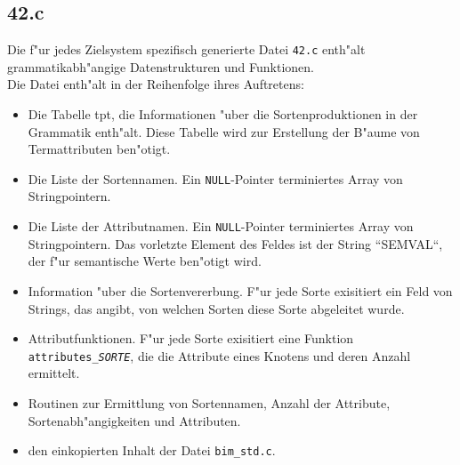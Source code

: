 \subsection{42.c}
Die f"ur jedes Zielsystem spezifisch generierte Datei {\tt 42.c} enth"alt
grammatikabh"angige Datenstrukturen und Funktionen.\\ Die Datei enth"alt in
der Reihenfolge ihres Auftretens:\\
\begin{itemize}
\item Die Tabelle tpt, die Informationen "uber die Sortenproduktionen in
der Grammatik enth"alt. Diese Tabelle wird zur Erstellung der B"aume
von Termattributen ben"otigt.
\item Die Liste der Sortennamen. Ein {\tt NULL}-Pointer terminiertes Array
von Stringpointern.
\item Die Liste der Attributnamen. Ein {\tt NULL}-Pointer terminiertes Array
von Stringpointern. Das vorletzte Element des Feldes ist der String
 ``SEMVAL``, der f"ur semantische Werte ben"otigt wird.
\item Information "uber die Sortenvererbung. F"ur jede Sorte exisitiert ein
Feld von Strings, das angibt, von welchen Sorten diese Sorte abgeleitet wurde.
\item Attributfunktionen. F"ur jede Sorte exisitiert eine Funktion {\tt
attributes\_\sl SORTE}, die die Attribute eines Knotens und deren Anzahl
ermittelt.
\item Routinen zur Ermittlung von Sortennamen, Anzahl der Attribute, 
Sortenabh"angigkeiten und Attributen. 
\item den einkopierten Inhalt der Datei {\tt bim\_std.c}.

\end{itemize} 
















